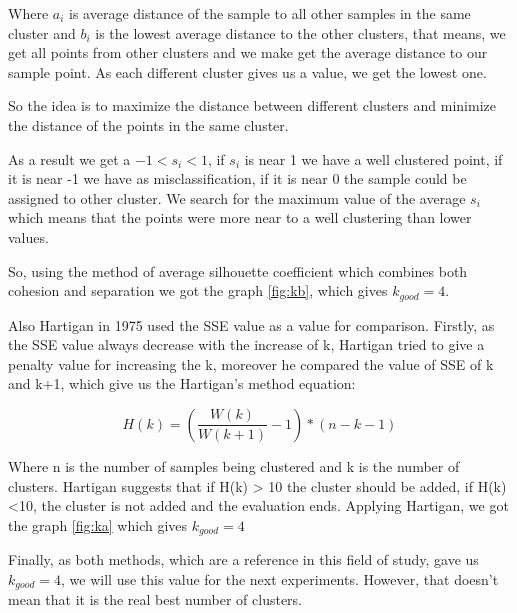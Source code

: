 \documentclass[a4paper,11pt]{article}
\begin{document}
Where $a_i$ is  average distance of the  sample to all other samples  in the same
cluster and  $b_i$ is the  lowest average distance to the other
clusters, that means, we get all points from other clusters and we make get the
average distance to our sample point. As each different cluster gives us a value,
we get the lowest one.

So the idea is to maximize the distance between different clusters and minimize the distance
of the points in the same cluster.

As a result we get a $-1 < s_i < 1$, if $s_i$ is near 1 we have a well clustered
point, if it is near -1 we have as misclassification, if it is near 0 the sample
could be assigned to other cluster. We search for the maximum value of the average
$s_i$ which means  that the points were more near to  a well clustering than
lower values.

So, using the method of average silhouette coefficient which combines both 
cohesion and separation we got the graph \ref{fig:kb}, which gives $k_{good} = 4$.



Also Hartigan in 1975 used the SSE value as a value for comparison. Firstly, as
the SSE value always  decrease with the increase of k, Hartigan  tried to give a
penalty value for increasing the k, moreover he compared the value of SSE of k
and k+1, which give us the Hartigan's method equation:

\begin{equation*}
H(k) = \left ( \frac{W(k)}{W(k+1)}-1  \right )*(n-k-1)
\end{equation*}

Where  n is  the number  of samples  being clustered  and k  is the  number of
clusters. Hartigan suggests that if H(k) > 10 the cluster should be added, if H(k)<10,
the cluster is not added and the evaluation ends. Applying Hartigan, we got
the graph \ref{fig:ka} which gives $k_{good} = 4$

Finally, as both methods, which are a reference in this field of study, gave us $k_{good} = 4$, we will use this value for the next experiments. 
However, that doesn't mean that it is the real best number of clusters.
\end{document}
